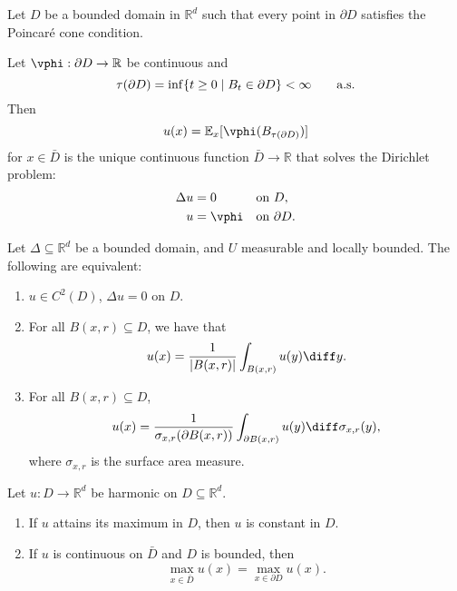 \documentclass[12pt]{article}
\begin{document}
\begin{theorem}
	Let $D$ be a bounded domain in $\mathbb{R}^d$ such that every point in $\partial D$ satisfies the Poincar\'e cone condition.

	Let $\vphi : \partial D \to \mathbb{R}$ be continuous and
	\[
		\tau(\partial D) = \inf \{t \geq 0 \mid B_t \in \partial D\} < \infty \qquad \text{\normalfont{a.s.}}
	\]
	Then
	\[
	u(x) = \mathbb{E}_x[\vphi(B_{\tau(\partial D)})]
	\]
	for $x \in \bar D$ is the unique continuous function $\bar D \to \mathbb{R}$ that solves the Dirichlet problem:
	\begin{align*}
		 \Delta u &= 0 & &\text{on } D, \\
		 u &= \vphi & &\text{on } \partial D.
	\end{align*}
\end{theorem}

\begin{theorem}
	Let $\Delta \subseteq \mathbb{R}^d$ be a bounded domain, and $U$ measurable and locally bounded. The following are equivalent:
	\begin{enumerate}[\normalfont(i)]
		\item $u \in C^2(D)$, $\Delta u = 0$ on $D$.
		\item For all $B(x, r) \subseteq D$, we have that
			\[
			u(x) = \frac{1}{|B(x, r)|} \int_{B(x, r)} u(y) \diff y.
			\]
			
		\item For all $B(x, r) \subseteq D$,
			\[
			u(x) = \frac{1}{\sigma_{x,r}(\partial B(x, r))} \int_{\partial B(x, r)} u(y) \diff \sigma_{x, r}(y),
			\]
			where $\sigma_{x,r}$ is the surface area measure.
	\end{enumerate}
\end{theorem}

\begin{theorem}
	Let $u : D \to \mathbb{R}^d$ be harmonic on $D \subseteq \mathbb{R}^d$.
	\begin{enumerate}[\normalfont(i)]
		\item If $u$ attains its maximum in $D$, then $u$ is constant in $D$.
		\item If $u$ is continuous on $\bar D$ and $D$ is bounded, then
			\[
			\max_{x \in \bar D} u(x) = \max_{x \in \partial D} u(x).
			\]
	\end{enumerate}
\end{theorem}
\end{document}
